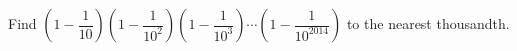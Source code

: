 Find $\left(1-\dfrac{1}{10}\right)\left(1-\dfrac{1}{10^2}\right)\left(1-\dfrac{1}{10^3}\right)\cdots\left(1-\dfrac{1}{10^{2014}}\right)$ to the nearest thousandth.
